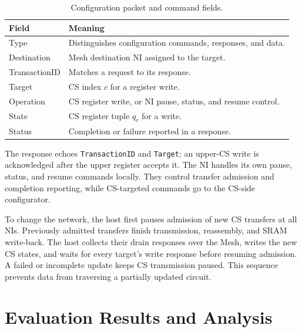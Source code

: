 \documentclass[conference,10pt]{IEEEtran}
\begin{document}
\begin{table}[!t]
  \caption{Configuration packet and command fields.}
  \label{tab:noc-command-fields}
  \centering
  \small
  \begin{tabularx}{\columnwidth}{@{}p{}>{\raggedright\arraybackslash}X@{}}
    \hline
    Field & Meaning \\
    \hline
    Type & Distinguishes configuration commands, responses, and data. \\
    Destination & Mesh destination NI assigned to the target. \\
    TransactionID & Matches a request to its response. \\
    Target & CS index $c$ for a register write. \\
    Operation & CS register write, or NI pause, status, and resume control. \\
    State & CS register tuple $q_c$ for a write. \\
    Status & Completion or failure reported in a response. \\
    \hline
  \end{tabularx}
\end{table}

The response echoes \texttt{TransactionID} and \texttt{Target};
an upper-CS write is acknowledged after the upper register accepts it.
The NI handles its own pause, status, and resume commands locally.
They control transfer admission and completion reporting, while
CS-targeted commands go to the CS-side configurator.

To change the network, the host first pauses admission of new CS
transfers at all NIs. Previously admitted transfers finish transmission,
reassembly, and SRAM write-back. The host collects their drain responses
over the Mesh, writes the new CS states, and waits for every target's
write response before resuming admission. A failed or incomplete update
keeps CS transmission paused. This sequence prevents data from
traversing a partially updated circuit.


\FloatBarrier

\section{Evaluation Results and Analysis}
\label{sec:experiment}
\end{document}
